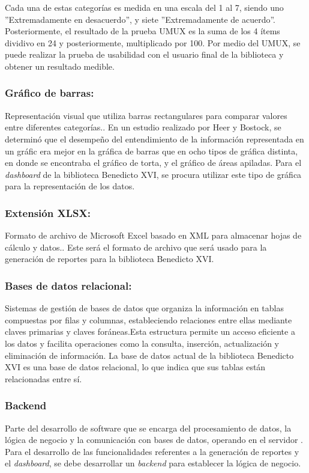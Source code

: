 \documentclass[spanish]{ieee_upb}
\begin{document}
Cada una de estas categorías es medida en una escala del 1 al 7, siendo uno ''Extremadamente en desacuerdo'', y siete ''Extremadamente de acuerdo''. Posteriormente, el resultado de la prueba UMUX es la suma de los 4 ítems dividivo en 24 y posteriormente, multiplicado por 100\cite{finstad2010usabilityUMUX}. Por medio del UMUX, se puede realizar la prueba de usabilidad con el usuario final de la biblioteca y obtener un resultado medible.

  \subsubsection{Gráfico de barras: } Representación visual que utiliza barras rectangulares para comparar valores entre diferentes categorías.\cite{healy2018data}. En un estudio realizado por Heer y Bostock\cite{heer2010crowdsourcingESTUDIOGRAFICAS}, se determinó que el desempeño del entendimiento de la información representada en un gráfic era mejor en la gráfica de barras que en ocho tipos de gráfica distinta, en donde se encontraba el gráfico de torta, y el gráfico de áreas apiladas. Para el \textit{dashboard} de la biblioteca Benedicto XVI, se procura utilizar este tipo de gráfica para la representación de los datos.


   \subsubsection{Extensión XLSX: } Formato de archivo de Microsoft Excel basado en XML para almacenar hojas de cálculo y datos.\cite{microsoft_xlsx_2019}. Este será el formato de archivo que será usado para la generación de reportes para la biblioteca Benedicto XVI.

  \subsubsection{Bases de datos relacional: } Sistemas de gestión de bases de datos que organiza la información en tablas compuestas por filas y columnas, estableciendo relaciones entre ellas mediante claves primarias y claves foráneas\cite{ibm_relational_databases}.Esta estructura permite un acceso eficiente a los datos y facilita operaciones como la consulta, inserción, actualización y eliminación de información\cite{ionos_relational_databases}.   La base de datos actual de la biblioteca Benedicto XVI es una base de datos relacional, lo que indica que sus tablas están relacionadas entre sí.

  \subsubsection{Backend} Parte del desarrollo de software que se encarga del procesamiento de datos, la lógica de negocio y la comunicación con bases de datos, operando en el servidor \cite{ibm_backend_2020}. Para el desarrollo de las funcionalidades referentes a la generación de reportes y el \textit{dashboard}, se debe desarrollar un \textit{backend} para establecer la lógica de negocio.
\end{document}
